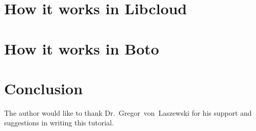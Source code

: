 \section{How it works in Libcloud}

\section{How it works in Boto}

\section{Conclusion}

\begin{acks}

The author would like to thank Dr.~Gregor~von~Laszewski for his support and suggestions in writing this tutorial.

\end{acks}


 


